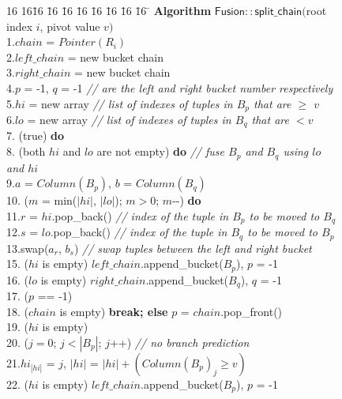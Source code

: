 \begin{figure}[t]
\begin{minipage}{4in}
{\small
\begin{tabbing}
16 16\= 16 \= 16 \= 16 \= 16 \= 16 \= 16 \= 16 \= 16 \= \kill
{\bf Algorithm} $\mathsf{Fusion::split\_chain}($root index $i$, pivot value $v)$\\
1.\>$chain$ = $Pointer(R_i)$\\
2.\>$left\_chain$ = new bucket chain\\
3.\>$right\_chain$ = new bucket chain\\
4.\>$p$ = -1, $q$ = -1 {\it// are the left and right bucket number respectively}\\
5.\>$hi$ = new array {\it// list of indexes of tuples in $B_p$ that are $\ge$ $v$}\\
6.\>$lo$ = new array {\it// list of indexes of tuples in $B_q$ that are $< v$}\\
7. (true) {\bf do}\\
8.\> (both $hi$ and $lo$ are not empty) {\bf do} {\it// fuse $B_p$ and $B_q$ using $lo$ and $hi$}\\
9.\>\>\>$a$ = $Column(B_p)$, $b$ = $Column(B_q)$\\
10.\>\> ($m$ = min($|hi|$, $|lo|$); $m>0$; $m$-{}-) {\bf do}\\
11.\>\>\>\>$r$ = $hi$.pop\_back() {\it// index of the tuple in $B_p$ to be moved to $B_q$}\\
12.\>\>\>\>$s$ = $lo$.pop\_back() {\it// index of the tuple in $B_q$ to be moved to $B_p$}\\
13.\>\>\>\>swap($a_r$, $b_s$) {\it// swap tuples between the left and right bucket}\\
15.\>\> ($hi$ is empty) $left\_chain$.append\_bucket($B_p$), $p$ = -1\\
16.\>\> ($lo$ is empty) $right\_chain$.append\_bucket($B_q$), $q$ = -1\\
17.\> ($p$ == -1)\\
18.\>\> ($chain$ is empty) {\bf break; else} $p$ = $chain$.pop\_front()\\
19.\> ($hi$ is empty)\\
20.\>\> ($j=0$; $j<|B_p|$; $j$++) {\it// no branch prediction}\\
21.\>\>\>\>$hi_{|hi|}$ = $j$, $|hi|$ = $|hi| + (Column(B_p)_j \ge v)$\\
22.\>\> ($hi$ is empty) $left\_chain$.append\_bucket($B_p$), $p$ = -1\\

\end{tabbing}}
\end{minipage}
\end{figure}
